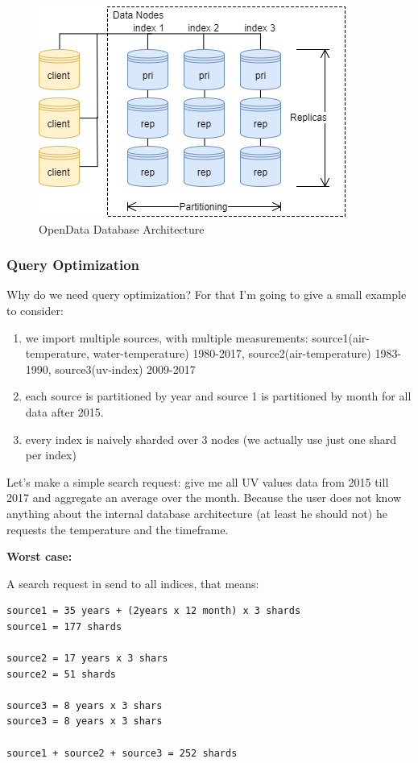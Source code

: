 \begin{figure}[htbp]
\centering
\includegraphics{images/07_database_architecture.png}
\caption{OpenData Database Architecture}
\end{figure}

\subsubsection{Query Optimization}\label{query-optimization}

Why do we need query optimization? For that I'm going to give a small
example to consider:

\begin{enumerate}
\def\labelenumi{\arabic{enumi}.}
\tightlist
\item
  we import multiple sources, with multiple measurements:
  source1(air-temperature, water-temperature) 1980-2017,
  source2(air-temperature) 1983-1990, source3(uv-index) 2009-2017
\item
  each source is partitioned by year and source 1 is partitioned by
  month for all data after 2015.
\item
  every index is naively sharded over 3 nodes (we actually use just one
  shard per index)
\end{enumerate}

Let's make a simple search request: give me all UV values data from 2015
till 2017 and aggregate an average over the month. Because the user does
not know anything about the internal database architecture (at least he
should not) he requests the temperature and the timeframe.

\textbf{Worst case:}

A search request in send to all indices, that means:

\begin{verbatim}
source1 = 35 years + (2years x 12 month) x 3 shards
source1 = 177 shards

source2 = 17 years x 3 shars
source2 = 51 shards

source3 = 8 years x 3 shars
source3 = 8 years x 3 shars

source1 + source2 + source3 = 252 shards
\end{verbatim}

